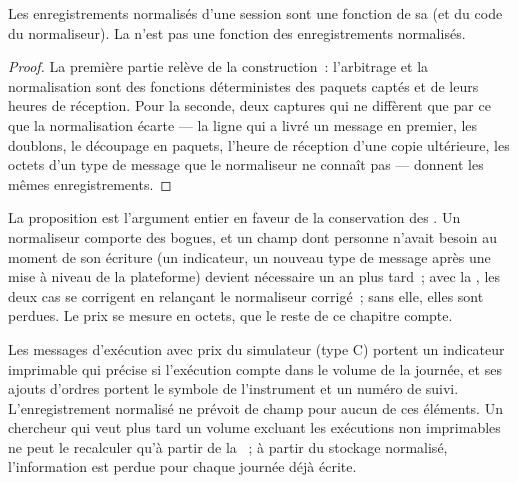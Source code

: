 \begin{proposition}\label{prop:pl:capturing-and-storing-tick-data:sufficient}
Les enregistrements normalisés d'une session sont une fonction de sa  (et du code du normaliseur). La 
n'est pas une fonction des enregistrements normalisés.
\end{proposition}

\begin{proof}
La première partie relève de la construction~: l'arbitrage et la normalisation sont des fonctions déterministes des paquets captés et
de leurs heures de réception. Pour la seconde, deux captures qui ne diffèrent que par ce que la normalisation écarte --- la ligne qui a livré un message
en premier, les doublons, le découpage en paquets, l'heure de réception d'une copie ultérieure, les octets d'un type de message que le normaliseur ne connaît pas
--- donnent les mêmes enregistrements.
\end{proof}

La proposition est l'argument entier en faveur de la conservation des . Un normaliseur comporte des bogues, et un champ
dont personne n'avait besoin au moment de son écriture (un indicateur, un nouveau type de message après une mise à niveau de la plateforme) devient nécessaire un an plus tard~; avec la , les deux cas se corrigent
en relançant le normaliseur corrigé~; sans elle, elles sont perdues. Le prix se mesure en octets, que le reste de ce chapitre
compte.

\begin{example}\label{ex:pl:capturing-and-storing-tick-data:field}
Les messages d'exécution avec prix du simulateur (type C) portent un indicateur imprimable qui précise si l'exécution compte dans le
volume de la journée, et ses ajouts d'ordres portent le symbole de l'instrument et un numéro de suivi. L'enregistrement normalisé ne prévoit de champ pour
aucun de ces éléments. Un chercheur qui veut plus tard un volume excluant les exécutions non imprimables ne peut le recalculer
qu'à partir de la ~; à partir du stockage normalisé, l'information est perdue pour chaque journée déjà écrite.
\end{example}

